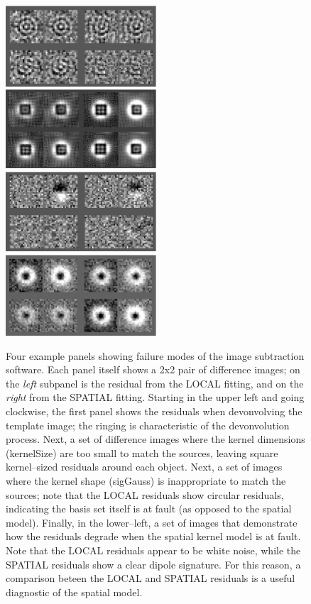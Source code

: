 \documentclass[prd, nofootinbib, floatfix, 11pt,tightenlines,times]{article}
\begin{document}
\begin{figure}
\includegraphics[width=0.5\textwidth, height=0.25\textwidth]{figures/deconv2.eps} 
\includegraphics[width=0.5\textwidth, height=0.25\textwidth]{figures/size2.eps} \\
\includegraphics[width=0.5\textwidth, height=0.25\textwidth]{figures/order2.eps} 
\includegraphics[width=0.5\textwidth, height=0.25\textwidth]{figures/shape2.eps} \\
\caption{Four example panels showing failure modes of the image
  subtraction software.  Each panel itself shows a 2x2 pair of
  difference images; on the {\it left} subpanel is the residual from
  the LOCAL fitting, and on the {\it right} from the SPATIAL fitting.
  Starting in the upper left and going clockwise, the first panel
  shows the residuals when devonvolving the template image; the
  ringing is characteristic of the devonvolution process.  Next, a set
  of difference images where the kernel dimensions (kernelSize) are
  too small to match the sources, leaving square kernel--sized
  residuals around each object.  Next, a set of images where the
  kernel shape (sigGauss) is inappropriate to match the sources; note
  that the LOCAL residuals show circular residuals, indicating the
  basis set itself is at fault (as opposed to the spatial model).
  Finally, in the lower--left, a set of images that demonstrate how
  the residuals degrade when the spatial kernel model is at fault.
  Note that the LOCAL residuals appear to be white noise, while the
  SPATIAL residuals show a clear dipole signature.  For this reason, a
  comparison beteen the LOCAL and SPATIAL residuals is a useful
  diagnostic of the spatial model.  }
\label{fig_galleryBad}
\end{figure}
\end{document}
